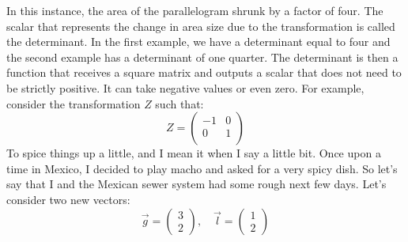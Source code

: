 \documentclass[600paper, 11pt,twoside,openany]{kdp}
\begin{document}
\indent In this instance, the area of the parallelogram shrunk by a factor of four. The scalar that represents the change in area size due to the transformation is called the determinant. In the first example, we have a determinant equal to four and the second example has a determinant of one quarter. The determinant is then a function that receives a square matrix and outputs a scalar that does not need to be strictly positive. It can take negative values or even zero. For example, consider the transformation $Z$ such that:
\[ Z = \begin{pmatrix}
-1 & 0   \\
0 & 1 \\
\end{pmatrix}
\]
\indent To spice things up a little, and I mean it when I say a little bit. Once upon a time in Mexico, I decided to play macho and asked for a very spicy dish. So let's say that I and the Mexican sewer system had some rough next few days. Let's consider two new vectors:
\[\overrightarrow{g} = \begin{pmatrix}
3 \\
2
\end{pmatrix}, \quad \overrightarrow{l} = \begin{pmatrix}
1\\
2
\end{pmatrix} \]
\end{document}
